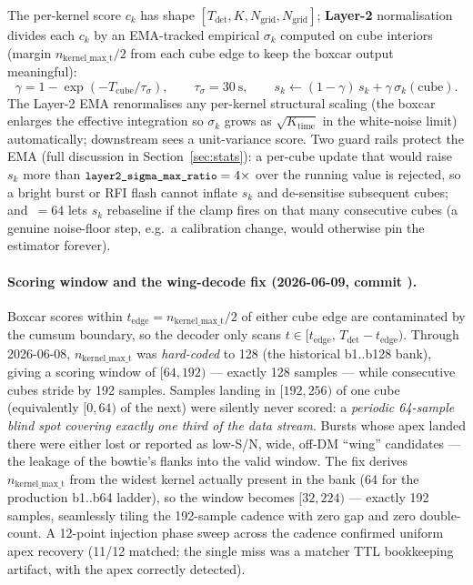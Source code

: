 \documentclass[11pt,a4paper]{article}
\newcommand{\codeword}[1]{\text{\ttfamily\small\detokenize{#1}}}
\begin{document}
The per-kernel score $c_k$ has shape
$[T_\mathrm{det}, K, N_\mathrm{grid}, N_\mathrm{grid}]$;
\textbf{Layer-2} normalisation divides each $c_k$ by an EMA-tracked
empirical $\sigma_k$ computed on cube interiors (margin
$n_\mathrm{kernel\_max\_t}/2$ from each cube edge to keep the boxcar
output meaningful):
\begin{equation}
   \gamma = 1 - \exp(-T_\mathrm{cube}/\tau_\sigma),
   \qquad
   \tau_\sigma = 30~\mathrm{s},
   \qquad
   s_k \leftarrow (1-\gamma)\, s_k + \gamma\,\sigma_k(\text{cube}).
   \label{eq:layer2}
\end{equation}
The Layer-2 EMA renormalises any per-kernel structural scaling
(the boxcar enlarges the effective integration so $\sigma_k$ grows as
$\sqrt{K_\mathrm{time}}$ in the white-noise limit) automatically;
downstream sees a unit-variance score.  Two guard rails protect the
EMA (full discussion in Section~\ref{sec:stats}): a per-cube update
that would raise $s_k$ more than
$\codeword{layer2_sigma_max_ratio}=4\times$ over the running value
is rejected, so a bright burst or RFI flash cannot inflate $s_k$ and
de-sensitise subsequent cubes; and
\codeword{layer2_clamp_escape_cubes}\,$=64$ lets $s_k$ rebaseline if
the clamp fires on that many consecutive cubes (a genuine noise-floor
step, e.g.\ a calibration change, would otherwise pin the estimator
forever).

\paragraph{Scoring window and the wing-decode fix (2026-06-09,
commit \codeword{5fb853a}).}  Boxcar scores within
$t_\mathrm{edge} = n_\mathrm{kernel\_max\_t}/2$ of either cube edge
are contaminated by the cumsum boundary, so the decoder only scans
$t \in [t_\mathrm{edge},\, T_\mathrm{det} - t_\mathrm{edge})$.
Through 2026-06-08, $n_\mathrm{kernel\_max\_t}$ was \emph{hard-coded}
to 128 (the historical b1..b128 bank), giving a scoring window of
$[64, 192)$ --- exactly 128 samples --- while consecutive cubes
stride by 192 samples.  Samples landing in $[192, 256)$ of one cube
(equivalently $[0, 64)$ of the next) were silently never scored: a
\emph{periodic 64-sample blind spot covering exactly one third of
the data stream}.  Bursts whose apex landed there were either lost
or reported as low-S/N, wide, off-DM ``wing'' candidates --- the
leakage of the bowtie's flanks into the valid window.  The fix
derives $n_\mathrm{kernel\_max\_t}$ from the widest kernel actually
present in the bank (64 for the production b1..b64 ladder), so the
window becomes $[32, 224)$ --- exactly 192 samples, seamlessly
tiling the 192-sample cadence with zero gap and zero double-count.
A 12-point injection phase sweep across the cadence confirmed
uniform apex recovery (11/12 matched; the single miss was a matcher
TTL bookkeeping artifact, with the apex correctly detected).
\end{document}
